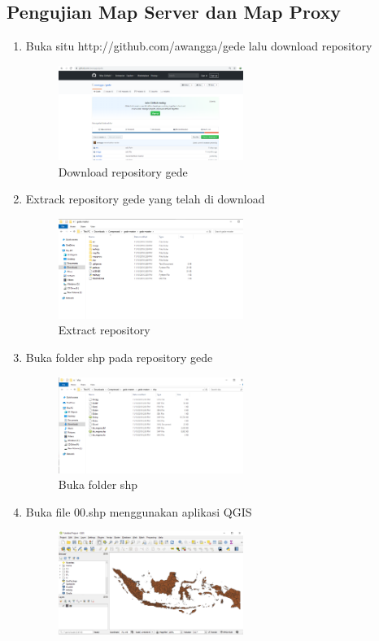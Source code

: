 \subsection{Pengujian Map Server dan Map Proxy}
\begin{enumerate}
	\item Buka situ http://github.com/awangga/gede lalu download repository
		\begin{figure}[H]
			\includegraphics[width=6cm]{figures/Tugas4/1174071/5.png}
			\centering
			\caption{Download repository gede}
		\end{figure}
	\item Extrack repository gede yang telah di download
		\begin{figure}[H]
			\includegraphics[width=6cm]{figures/Tugas4/1174071/6.png}
			\centering
			\caption{Extract repository}
		\end{figure}
	\item Buka folder shp pada repository gede
		\begin{figure}[H]
			\includegraphics[width=6cm]{figures/Tugas4/1174071/7.png}
			\centering
			\caption{Buka folder shp}
			\end{figure}
	\item Buka file 00.shp menggunakan aplikasi QGIS
		\begin{figure}[H]
			\includegraphics[width=6cm]{figures/Tugas4/1174071/8.png}

\end{figure}
\end{enumerate}
